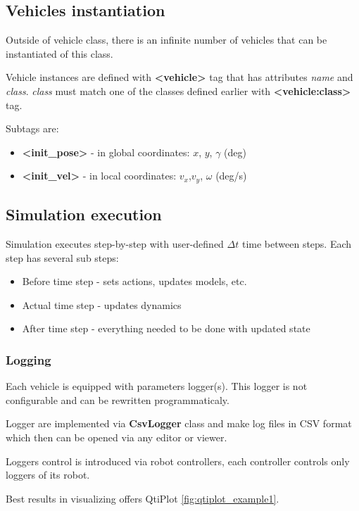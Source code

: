 \documentclass[a4paper,11pt]{article}
\begin{document}
\subsection{Vehicles instantiation}
Outside of vehicle class, there is an infinite number of vehicles that can be instantiated of this class.

Vehicle instances are defined with \textbf{\textless vehicle\textgreater} tag that has attributes \textit{name} and \textit{class}. \textit{class} must match one of the classes defined earlier with \textbf{\textless vehicle:class\textgreater} tag.

Subtags are:
\begin{itemize}
	\item \textbf{\textless init\_pose\textgreater} - in global coordinates: $x$, $y$, $\gamma$ (deg)
	\item \textbf{\textless init\_vel\textgreater} - in local coordinates: $v_x$,$v_y$, $\omega$ (deg/s)
\end{itemize}

\subsection{Simulation execution}
Simulation executes step-by-step with user-defined $\Delta t$ time between steps.
Each step has several sub steps:
\begin{itemize}
\item Before time step - sets actions, updates models, etc.
\item Actual time step - updates dynamics
\item After time step - everything needed to be done with updated state
\end{itemize}

\subsubsection{Logging}

Each vehicle is equipped with parameters logger(s). This logger is not configurable and can be rewritten programmaticaly.

Logger are implemented via \textbf{CsvLogger} class and make log files in CSV format which then can be opened via any editor or viewer.

Loggers control is introduced via robot controllers, each controller controls only loggers of its robot.

Best results in visualizing offers QtiPlot \ref{fig:qtiplot_example1}.
\end{document}
